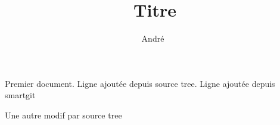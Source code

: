 \documentclass[a4paper, french, 12pt]{article}
\title{Titre}
\author{André~\bsc{Dewèvre}}
\date{}
\begin{document}
\maketitle

Premier document.
Ligne ajoutée depuis source tree.
Ligne ajoutée depuis smartgit

Une autre modif par source tree
\end{document}
